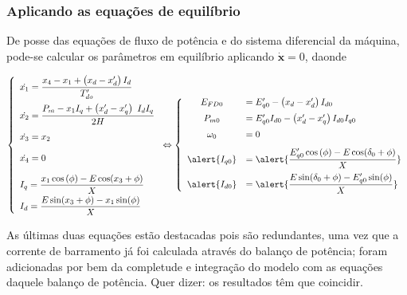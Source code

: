 \documentclass[10pt, compress,xcolor={svgnames,dvipsnames,x11names}]{beamer}
\begin{document}
\begin{frame}%
\frametitle{Aplicando as equações de equilíbrio}
\scriptsize

	De posse das equações de fluxo de potência e do sistema diferencial da máquina, pode-se calcular os parâmetros em equilíbrio aplicando $\dot{\mathbf{x}} = 0$, daonde

\begin{gather}
\left\{ \begin{array}{l}
\dot{x_1} = \dfrac{x_4 - x_1 + \left(\strut x_d - x'_d \right)I_d}{T'_{do}} \\[4mm]
%
\dot{x_2} = \dfrac{P_m - x_1 I_q + \left(\strut x'_d - x'_q \right)\ I_d I_q}{2H}\\[4mm]
%
\dot{x_3} = x_2\\[4mm]
%
\dot{x_4} = 0\\[4mm]
%
I_q = \dfrac{x_1\cos\left(\phi\right) - E\cos(x_3 + \phi) }{X} \\[2mm]
%
I_d = \dfrac{E\sin(x_3 + \phi) - x_1\sin(\phi) }{X}
\end{array}\right. \Leftrightarrow 
\left\{\begin{array}{cl}
	E_{FD0} &= E'_{q0} - \left(\strut x_d - x'_d \right)I_{d0} \\[2mm]
	P_{m0} &= E'_{q0}I_{d0} - \left(x'_d - x'_q \right)I_{d0}I_{q0} \\[2mm]
	\omega_0 &= 0 \\[3mm]
	\alert{ I_{q0} } &= \alert{ \dfrac{E'_{q0}\cos\left(\phi\right) - E\cos(\delta_0 + \phi) }{X} }\\[3mm]
	\alert{I_{d0}} &= \alert{\dfrac{E\sin(\delta_0 + \phi) - E'_{q0}\sin(\phi) }{X}}
\end{array}\right.\label{sis::equilibrio}
\end{gather}

	As últimas duas equações estão destacadas pois são redundantes, uma vez que a corrente de barramento já foi calculada através do balanço de potência; foram adicionadas por bem da completude e integração do modelo com as equações daquele balanço de potência. Quer dizer: os resultados têm que coincidir.

\normalsize
\end{frame}%
\end{document}
